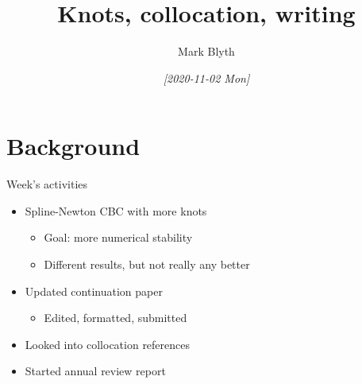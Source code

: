 \documentclass[presentation]{beamer}
\author{Mark Blyth}
\date{\textit{[2020-11-02 Mon]}}
\title{Knots, collocation, writing}
\begin{document}
\maketitle

\section{Background}
\label{sec:orgddfbb1e}
\begin{frame}[label={sec:org81147a2}]{Week's activities}
\begin{itemize}
\item Spline-Newton CBC with more knots
\begin{itemize}
\item Goal: more numerical stability
\item Different results, but not really any better
\end{itemize}
\end{itemize}
\vfill
\begin{itemize}
\item Updated continuation paper
\begin{itemize}
\item Edited, formatted, submitted
\end{itemize}
\end{itemize}
\vfill
\begin{itemize}
\item Looked into collocation references
\end{itemize}
\vfill
\begin{itemize}
\item Started annual review report
\end{itemize}
\end{frame}
\end{document}
